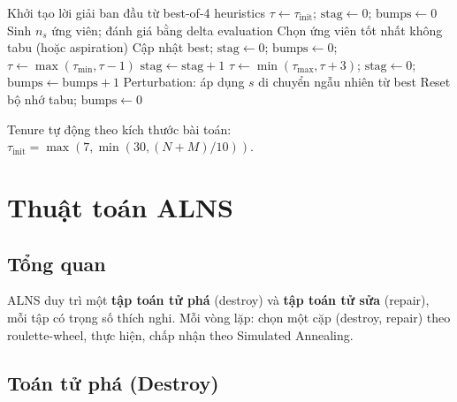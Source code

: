 \documentclass[12pt, a4paper]{article}
\begin{document}
\begin{algorithm}[H]
\caption{Adaptive Tabu Search với ILS-style Restart}
\begin{algorithmic}[1]
\State Khởi tạo lời giải ban đầu từ best-of-4 heuristics
\State $\tau \leftarrow \tau_{\text{init}}$; \; $\text{stag} \leftarrow 0$; \; $\text{bumps} \leftarrow 0$
  \State Sinh $n_s$ ứng viên; đánh giá bằng delta evaluation
  \State Chọn ứng viên tốt nhất không tabu (hoặc aspiration)
    \State Cập nhật best; $\text{stag} \leftarrow 0$; $\text{bumps} \leftarrow 0$; $\tau \leftarrow \max(\tau_{\min}, \tau - 1)$
  \Else
    \State $\text{stag} \leftarrow \text{stag} + 1$
      \State $\tau \leftarrow \min(\tau_{\max}, \tau + 3)$; $\text{stag} \leftarrow 0$; $\text{bumps} \leftarrow \text{bumps} + 1$
        \State Perturbation: áp dụng $s$ di chuyển ngẫu nhiên từ best
        \State Reset bộ nhớ tabu; $\text{bumps} \leftarrow 0$
      \EndIf
    \EndIf
  \EndIf
\EndFor
\end{algorithmic}
\end{algorithm}

Tenure tự động theo kích thước bài toán: $\tau_{\text{init}} = \max(7, \min(30, (N+M)/10))$.

\section{Thuật toán ALNS}

\subsection{Tổng quan}

ALNS duy trì một \textbf{tập toán tử phá} (destroy) và \textbf{tập toán tử sửa} (repair), mỗi tập có trọng số thích nghi. Mỗi vòng lặp: chọn một cặp (destroy, repair) theo roulette-wheel, thực hiện, chấp nhận theo Simulated Annealing.

\subsection{Toán tử phá (Destroy)}
\end{document}
